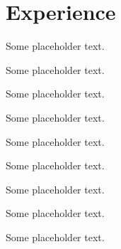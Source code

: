 \documentclass[letterpaper]{resume}
\begin{document}
\hfill
%
%
\begin{minipage}[t]{0.66\textwidth} %


\section{Experience}

\vspace{\topsep} %
\begin{tightitemize}
\item Some placeholder text.
\item Some placeholder text.
\item Some placeholder text.
\end{tightitemize}

\sectionspace %


\begin{tightitemize}
\item Some placeholder text.
\item Some placeholder text.
\item Some placeholder text.
\end{tightitemize}

\sectionspace %


\begin{tightitemize}
\item Some placeholder text.
\item Some placeholder text.
\item Some placeholder text.
\end{tightitemize}


\end{minipage}
\end{document}
